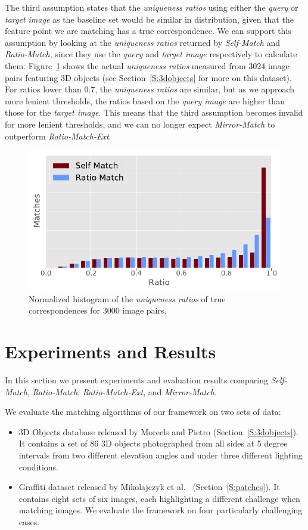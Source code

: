 \documentclass[review]{elsarticle}
\begin{document}
The third assumption states that the \emph{uniqueness ratios} using either the \emph{query} or \emph{target image} as the baseline set would be similar in distribution, given that the feature point we are matching has a true correspondence. We can support this assumption by looking at the \emph{uniqueness ratios} returned by \emph{Self-Match} and \emph{Ratio-Match}, since they use the \emph{query} and \emph{target image} respectively to calculate them. Figure~\ref{fig:ratio_hist} shows the actual \emph{uniqueness ratios} measured from 3024 image pairs featuring 3D objects (see Section~\ref{S:3dobjects} for more on this dataset).  For ratios lower than $0.7$, the \emph{uniqueness ratios} are similar, but as we approach more lenient thresholds, the ratios based on the \emph{query image} are higher than those for the \emph{target image}. This means that the third assumption becomes invalid for more lenient thresholds, and we can no longer expect \emph{Mirror-Match} to outperform \emph{Ratio-Match-Ext}.


\begin{figure}[htb]
\centering
\includegraphics[width=0.7\columnwidth]{images/results_ratio_hist}
\caption{Normalized histogram of the \emph{uniqueness ratios} of true correspondences for 3000 image pairs.}
\label{fig:ratio_hist}
\end{figure}


\section{Experiments and Results}
\label{S:Experiments}
%
In this section we present experiments and evaluation results comparing \emph{Self-Match}, \emph{Ratio-Match}, \emph{Ratio-Match-Ext}, and \emph{Mirror-Match}. 

We evaluate the matching algorithms of our framework on two sets of data:
\begin{itemize}
\item 3D Objects database released by Moreels and Pietro \cite{moreels2007evaluation} (Section~\ref{S:3dobjects}).  It contains a set of 86 3D objects photographed from all sides at 5 degree intervals from two different elevation angles and under three different lighting conditions. 
\item Graffiti dataset released by Mikolajczyk et al.\ \cite{mikolajczyk2005performance} (Section~\ref{S:patches}).  It contains eight sets of six images, each highlighting a different challenge when matching images. We evaluate the framework on four particularly challenging cases.
\end{itemize}
\end{document}
